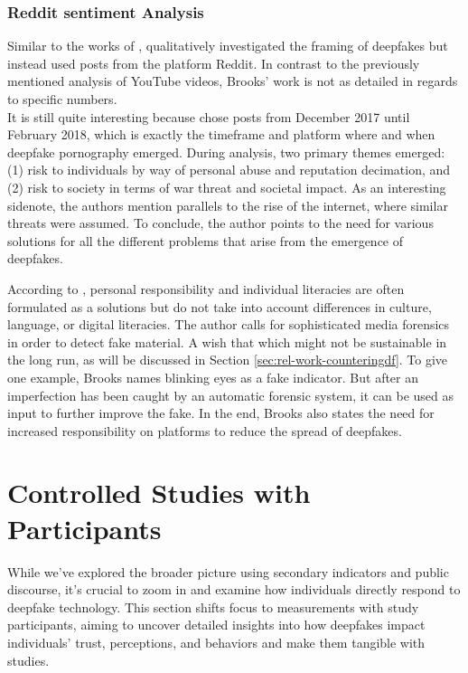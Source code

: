 \documentclass[
  a4paper,  %
  twoside,  %
  bibliography=totoc,
  headsepline,
  cleardoublepage=empty,
  parskip=half,
  draft=false
]{scrbook}
\begin{document}
\subsubsection*{Reddit sentiment Analysis}
Similar to the works of \citeauthor{leeBelieveNotBelieve2021}, \citeauthor{brooksPopularDiscourseDeepfakes2021} qualitatively investigated the framing of deepfakes but instead used posts from the platform Reddit. In contrast to the previously mentioned analysis of YouTube videos, Brooks' work is not as detailed in regards to specific numbers. \\
It is still quite interesting because \citeauthor{brooksPopularDiscourseDeepfakes2021} chose posts from December 2017 until February 2018, which is exactly the timeframe and platform where and when deepfake pornography emerged. During analysis, two primary themes emerged: (1) risk to individuals by way of personal abuse and reputation decimation, and (2) risk to society in terms of war threat and societal impact. As an interesting sidenote, the authors mention parallels to the rise of the internet, where similar threats were assumed. To conclude, the author points to the need for various solutions for all the different problems that arise from the emergence of deepfakes.

According to \cite{brooksPopularDiscourseDeepfakes2021}, personal responsibility and individual literacies are often formulated as a solutions but do not take into account differences in culture, language, or digital literacies. The author calls for sophisticated media forensics in order to detect fake material. A wish that which might not be sustainable in the long run, as will be discussed in Section \ref{sec:rel-work-counteringdf}. To give one example, Brooks names blinking eyes as a fake indicator. But after an imperfection has been caught by an automatic forensic system, it can be used as input to further improve the fake. In the end, Brooks also states the need for increased responsibility on platforms to reduce the spread of deepfakes.

\section{Controlled Studies with Participants}
\label{sec:rel-studypart}

While we've explored the broader picture using secondary indicators and public discourse, it's crucial to zoom in and examine how individuals directly respond to deepfake technology. This section shifts focus to measurements with study participants, aiming to uncover detailed insights into how deepfakes impact individuals' trust, perceptions, and behaviors and make them tangible with studies.
\end{document}
